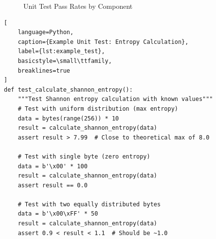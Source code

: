\begin{figure}[h]
\centering
\caption{Unit Test Pass Rates by Component}
\label{fig:test_pass_rates}
\end{figure}


\begin{lstlisting}[
    language=Python,
    caption={Example Unit Test: Entropy Calculation},
    label={lst:example_test},
    basicstyle=\small\ttfamily,
    breaklines=true
]
def test_calculate_shannon_entropy():
    """Test Shannon entropy calculation with known values"""
    # Test with uniform distribution (max entropy)
    data = bytes(range(256)) * 10
    result = calculate_shannon_entropy(data)
    assert result > 7.99  # Close to theoretical max of 8.0
    
    # Test with single byte (zero entropy)
    data = b'\x00' * 100
    result = calculate_shannon_entropy(data)
    assert result == 0.0
    
    # Test with two equally distributed bytes
    data = b'\x00\xFF' * 50
    result = calculate_shannon_entropy(data)
    assert 0.9 < result < 1.1  # Should be ~1.0
\end{lstlisting}


